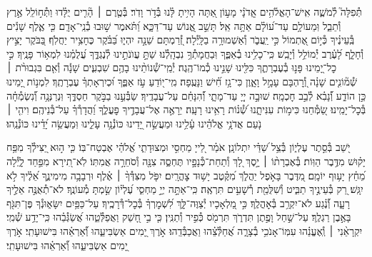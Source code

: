 \documentclass[twoside, openany, parskip=half, 11pt]{book}
\begin{document}
\begin{narrow}
תְּ֯פִלָּה֮ לְ֯מֹשֶׁ֢ה אִֽישׁ־הָאֱלֹ֫הִ֥ים \hfill \break
אֲֽדֹנָ֗י מָע֣וֹן אַ֭תָּה הָיִ֥יתָ לָּ֗נוּ בְּ֯דֹ֣ר וָדֹֽר׃
בְּ֯טֶ֤רֶם ׀ הָ֘רִ֤ים יֻלָּ֗דוּ וַתְּ֯ח֣וֹלֵֽל אֶ֣רֶץ וְ֯תֵבֵ֑ל וּֽמֵעוֹלָ֥ם עַד־ע֝וֹלָ֗ם אַתָּ֥ה אֵֽל׃
תָּשֵׁ֣ב אֱ֭נוֹשׁ עַד־דַּכָּ֑א וַ֝תֹּ֗אמֶר שׁ֣וּבוּ בְ֯נֵֽי־אָדָֽם׃
כִּ֤י אֶ֪לֶף שָׁנִ֡ים בְּֽ֯עֵינֶ֗יךָ כְּ֯י֣וֹם אֶ֭תְמוֹל כִּ֣י יַֽעֲבֹ֑ר וְ֯אַשְׁמוּרָ֥ה בַלָּֽיְ֯לָה׃
זְ֭֯רַמְתָּם שֵׁנָ֣ה יִהְי֑וּ בַּ֝בֹּ֗קֶר כֶּחָצִ֥יר יַחֲלֹֽף׃
בַּ֭בֹּקֶר יָצִ֣יץ וְ֯חָלָ֑ף לָ֝עֶ֗רֶב יְ֯מוֹלֵ֥ל וְ֯יָבֵֽשׁ׃
כִּֽי־כָלִ֥ינוּ בְ֯אַפֶּ֑ךָ וּֽבַחֲמָתְ֯ךָ֥ נִבְהָֽלְ֯נוּ׃
שַׁתָּ֣ עֲוֺנֹתֵ֣ינוּ לְ֯נֶגְדֶּ֑ךָ עֲ֝לֻמֵ֗נוּ לִמְא֥וֹר פָּנֶֽיךָ׃
כִּ֣י כׇל־יָ֭מֵינוּ פָּנ֣וּ בְ֯עֶבְרָתֶ֑ךָ כִּלִּ֖ינוּ שָׁנֵ֣ינוּ כְ֯מוֹ־הֶֽגֶה׃
יְ֯מֵֽי־שְׁ֯נוֹתֵ֨ינוּ בָהֶ֥ם שִׁבְעִ֪ים שָׁנָ֡ה וְ֯אִ֤ם בִּגְבוּרֹ֨ת ׀ שְׁ֯מ֘וֹנִ֤ים שָׁנָ֗ה וְ֭֯רׇהְבָּם עָמָ֣ל וָאָ֑וֶן כִּי־גָ֥ז חִ֗֝ישׁ וַנָּעֻֽפָה׃
מִֽי־י֭וֹדֵעַ עֹ֣ז אַפֶּ֑ךָ וּ֝כְיִרְאָתְךָ֗ עֶבְרָתֶֽךָ׃
לִמְנ֣וֹת יָ֭מֵינוּ כֵּ֣ן הוֹדַ֑ע וְ֯֝נָבִ֗א לְ֯בַ֣ב חׇכְמָֽה׃
שׁוּבָ֣ה יְיָ֭ עַד־מָתָ֑י וְ֯֝הִנָּחֵ֗ם עַל־עֲבָדֶֽיךָ׃
שַׂבְּ֯עֵ֣נוּ בַבֹּ֣קֶר חַסְדֶּ֑ךָ וּֽנְרַנְּנָ֥ה וְ֯֝נִשְׂמְ֯חָ֗ה בְּ֯כׇל־יָמֵֽינוּ׃
שַׂ֭מְּ֯חֵנוּ כִּימ֣וֹת עִנִּיתָ֑נוּ שְׁ֯֝נ֗וֹת רָאִ֥ינוּ רָעָֽה׃
יֵרָאֶ֣ה אֶל־עֲבָדֶ֣יךָ פׇעֳלֶ֑ךָ וַ֝הֲדָרְ֯ךָ֗ עַל־בְּ֯נֵיהֶֽם׃
וִיהִ֤י ׀ נֹ֤עַם אֲדֹנָ֥י אֱלֹהֵ֗ינוּ עָ֫לֵ֥ינוּ וּמַעֲשֵׂ֣ה יָ֭דֵינוּ כּוֹנְ֯נָ֥ה עָלֵ֑ינוּ וּֽמַעֲשֵׂ֥ה יָ֝דֵ֗ינוּ כּוֹנְ֯נֵֽהוּ׃


יֹ֭שֵׁב בְּ֯סֵ֣תֶר עֶלְי֑וֹן
\hfill בְּ֯צֵ֥ל שַׁ֝דַּ֗י יִתְלוֹנָֽן׃
אֹמַ֗ר לַ֭ייָ מַחְסִ֣י וּמְצוּדָתִ֑י אֱ֝לֹהַ֗י אֶבְטַח־בּֽוֹ׃
כִּ֤י ה֣וּא יַ֭צִּילְ֯ךָ מִפַּ֥ח יָק֗וּשׁ מִדֶּ֥בֶר הַוּֽוֹת׃
בְּ֯אֶבְרָת֨וֹ ׀ יָ֣סֶךְ לָ֭ךְ וְ֯תַחַת־כְּ֯נָפָ֣יו תֶּחְסֶ֑ה צִנָּ֖ה וְ֯סֹחֵרָ֣ה אֲמִתּֽוֹ׃
לֹֽא־תִ֭ירָא מִפַּ֣חַד לָ֑יְ֯לָה מֵ֝חֵ֗ץ יָע֥וּף יוֹמָֽם׃
מִ֭דֶּבֶר בָּאֹ֣פֶל יַהֲלֹ֑ךְ מִ֝קֶּ֗טֶב יָשׁ֥וּד צׇהֳרָֽיִם׃
יִפֹּ֤ל מִצִּדְּ֯ךָ֨ ׀ אֶ֗לֶף וּרְבָבָ֥ה מִימִינֶ֑ךָ אֵ֝לֶ֗יךָ לֹ֣א יִגָּֽשׁ׃
רַ֭ק בְּ֯עֵינֶ֣יךָ תַבִּ֑יט וְ֯שִׁלֻּמַ֖ת רְ֯שָׁעִ֣ים תִּרְאֶֽה׃
כִּֽי־אַתָּ֣ה יְיָ֣ מַחְסִ֑י עֶ֝לְי֗וֹן שַׂ֣מְתָּ מְ֯עוֹנֶֽךָ׃
לֹא־תְ֯אֻנֶּ֣ה אֵלֶ֣יךָ רָעָ֑ה וְ֯֝נֶ֗גַע לֹא־יִקְרַ֥ב בְּ֯אׇהֳלֶֽךָ׃
כִּ֣י מַ֭לְאָכָיו יְ֯צַוֶּה־לָּ֑ךְ לִ֝שְׁמׇרְךָ֗ בְּ֯כׇל־דְּ֯רָכֶֽיךָ׃
עַל־כַּפַּ֥יִם יִשָּׂא֑וּנְ֯ךָ פֶּן־תִּגֹּ֖ף בָּאֶ֣בֶן רַגְלֶֽךָ׃
עַל־שַׁ֣חַל וָפֶ֣תֶן תִּדְרֹ֑ךְ תִּרְמֹ֖ס כְּ֯פִ֣יר וְ֯תַנִּֽין׃
כִּ֤י בִ֣י חָ֭שַׁק וַאֲפַלְּ֯טֵ֑הוּ אֲ֝שַׂגְּ֯בֵ֗הוּ כִּֽי־יָדַ֥ע שְׁ֯מִֽי׃
יִקְרָאֵ֨נִי ׀ וְֽ֯אֶעֱנֵ֗הוּ עִמּֽוֹ־אָנֹכִ֥י בְ֯צָרָ֑ה אֲ֝חַלְּ֯צֵ֗הוּ וַאֲכַבְּ֯דֵֽהוּ׃
אֹ֣רֶךְ יָ֭מִים אַשְׂבִּיעֵ֑הוּ וְ֯֝אַרְאֵ֗הוּ בִּישׁוּעָתִֽי׃
\scriptsize{אֹ֣רֶךְ יָ֭מִים אַשְׂבִּיעֵ֑הוּ וְ֯֝אַרְאֵ֗הוּ בִּישׁוּעָתִֽי׃ }
\normalsize{}


\end{narrow}
\end{document}
